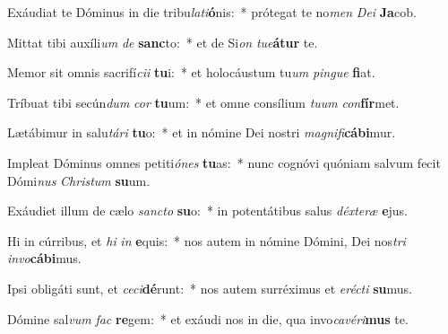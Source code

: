 \item Exáudiat te Dóminus in die tribu\textit{la}\textit{ti}\textbf{ó}nis:~* prótegat te no\textit{men} \textit{De}\textit{i} \textbf{Ja}cob.
\item Mittat tibi auxíli\textit{um} \textit{de} \textbf{sanc}to:~* et de Si\textit{on} \textit{tu}\textit{e}\textbf{á}\textbf{tur} te.
\item Memor sit omnis sacrifí\textit{ci}\textit{i} \textbf{tu}i:~* et holocáustum tu\textit{um} \textit{pin}\textit{gue} \textbf{fi}at.
\item Tríbuat tibi secún\textit{dum} \textit{cor} \textbf{tu}um:~* et omne consílium \textit{tu}\textit{um} \textit{con}\textbf{fír}met.
\item Lætábimur in salu\textit{tá}\textit{ri} \textbf{tu}o:~* et in nómine Dei nostri \textit{ma}\textit{gni}\textit{fi}\textbf{cá}\textbf{bi}mur.
\item Impleat Dóminus omnes petiti\textit{ó}\textit{nes} \textbf{tu}as:~* nunc cognóvi quóniam salvum fecit Dómi\textit{nus} \textit{Chris}\textit{tum} \textbf{su}um.
\item Exáudiet illum de cælo \textit{sanc}\textit{to} \textbf{su}o:~* in potentátibus salus \textit{déx}\textit{te}\textit{ræ} \textbf{e}jus.
\item Hi in cúrribus, et \textit{hi} \textit{in} \textbf{e}quis:~* nos autem in nómine Dómini, Dei nos\textit{tri} \textit{in}\textit{vo}\textbf{cá}\textbf{bi}mus.
\item Ipsi obligáti sunt, et \textit{ce}\textit{ci}\textbf{dé}runt:~* nos autem surréximus et \textit{e}\textit{réc}\textit{ti} \textbf{su}mus.
\item Dómine sal\textit{vum} \textit{fac} \textbf{re}gem:~* et exáudi nos in die, qua invo\textit{ca}\textit{vé}\textit{ri}\textbf{mus} te.
